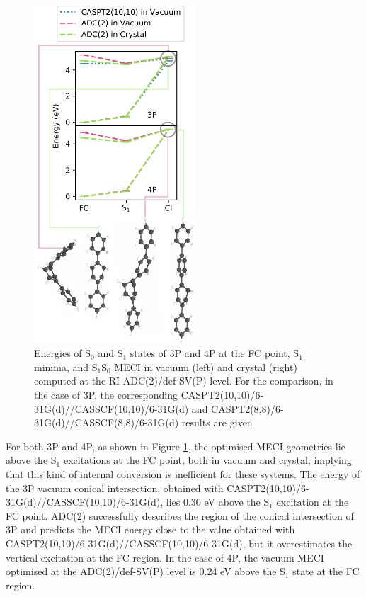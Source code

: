 \begin{figure}[h!]
\centering
\includegraphics[width=6cm]{Chapters/7Applications/nP_conicals_master.pdf}
\caption{Energies of S$_0$ and S$_1$ states of 3P and 4P at the FC point, S$_1$ minima, and S$_1$\textendash{}S$_0$ MECI in vacuum (left) and crystal (right) computed at the RI-ADC(2)/def-SV(P) level. For the comparison, in the case of 3P, the corresponding CASPT2(10,10)/6-31G(d)//CASSCF(10,10)/6-31G(d) and CASPT2(8,8)/6-31G(d)//CASSCF(8,8)/6-31G(d) results are given}
\label{fig:nP_pathways}
\end{figure}

For both 3P and 4P, as shown in Figure \ref{fig:nP_pathways}, the optimised MECI geometries lie above the S$_1$ excitations at the FC point, both in vacuum and crystal, implying that this kind of internal conversion is inefficient for these systems. The energy of the 3P vacuum conical intersection, obtained with CASPT2(10,10)/6-31G(d)//CASSCF(10,10)/6-31G(d), lies 0.30 eV above the S$_1$ excitation at the FC point. ADC(2) successfully describes the region of the conical intersection of 3P and predicts the MECI energy close to the value obtained with CASPT2(10,10)/6-31G(d)//CASSCF(10,10)/6-31G(d), but it overestimates the vertical excitation at the FC region. In the case of 4P, the vacuum MECI optimised at the ADC(2)/def-SV(P) level is 0.24 eV above the S$_1$ state at the FC region.

